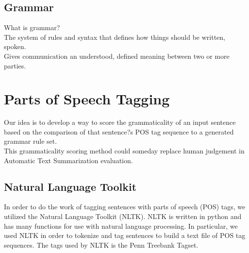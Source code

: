 \documentclass[11pt,a4paper]{article}
\begin{document}
\begin{multicols}{2}
\subsection{Grammar}
What is grammar?\\
The system of rules and syntax that defines how things should be written, spoken.\\
Gives communication an understood, defined meaning between two or more parties.


\section{Parts of Speech Tagging}
Our idea is to develop a way to score the grammaticality of an input sentence based on the comparison of that sentence?s POS tag sequence to a generated grammar rule set.\\
This grammaticality scoring method could someday replace human judgement in Automatic Text Summarization evaluation.


\subsection{Natural Language Toolkit}

In order to do the work of tagging sentences with parts of speech (POS) tags, we utilized the Natural Language Toolkit (NLTK). \cite{nltk} NLTK is written in python and has many functions for use with natural language processing. In particular, we used NLTK in order to tokenize and tag sentences to build a text file of POS tag sequences. The tags used by NLTK is the Penn Treebank Tagset.


\end{multicols}
\end{document}
